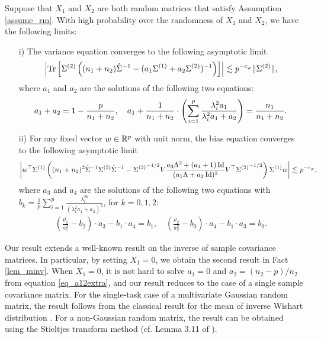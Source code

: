 \begin{theorem}\label{thm_main_RMT}
	Suppose that $X_1$ and $X_2$ are both random matrices that satisfy Assumption \ref{assume_rm}.
	With high probability over the randomness of $X_1$ and $X_2$, we have the following limits:
	\begin{enumerate}
		\item[i)]  The variance equation converges to the following asymptotic limit
			\begin{align}\label{lem_cov_shift_eq}
				{\left| {\operatorname{Tr}\left[\Sigma^{(2)} \left({(n_1 + n_2){\hat{\Sigma}^{-1}} - (a_1 \Sigma^{(1)} + a_2 \Sigma^{(2)})^{-1}}\right)\right]} \right|} \lesssim p^{-c_{\varphi}}\|\Sigma^{(2)}\|,
			\end{align}
			where $a_1$ and $a_2$ are the solutions of the following two equations:
			\begin{align}
				a_1 + a_2 = 1- \frac{p}{n_1 + n_2},\quad a_1 + \frac1{n_1 + n_2}\cdot \left({\sum_{i=1}^p \frac{\lambda_i^2 a_1}{\lambda_i^2 a_1 + a_2}}\right) = \frac{n_1}{n_1 + n_2}. \label{eq_a12extra}
			\end{align}
		\item[ii)] For any fixed vector $w\in\mathbb{R}^p$ with unit norm, the bias equation converges to the following asymptotic limit
			\begin{align}\label{lem_cov_derv_eq}
				{\left| {w^{\top} \Sigma^{(1)} \left({(n_1+n_2)^2\hat{\Sigma}^{-1} \Sigma^{(2)} \hat{\Sigma}^{-1} - {\Sigma^{(2)}}^{-1/2} V {\frac{a_3 \Lambda^2 + (a_4 + 1)\operatorname{Id}}{(a_1 \Lambda + a_2\operatorname{Id})^2}} V^{\top} {\Sigma^{(2)}}^{-1/2}}\right) \Sigma^{(1)} w} \right|} \lesssim p^{-c_{\varphi}},
			\end{align}
				where $a_{3}$ and $a_4$ are the solutions of the following two equations with $b_k = \frac1{p}\sum_{i=1}^p \frac{\lambda_i^{2k}} {(\lambda_i^2 a_1 + a_2)^2}$, for $k = 0, 1, 2$:
			\begin{align}\label{eq_a34extra}
				\left(\frac{\rho_1}{a_1^{2}} -  b_2  \right)\cdot  a_3 -  b_1 \cdot  a_4 = b_1,\quad \left(\frac{\rho_2}{a_2^{2}}-  b_0\right)\cdot  a_4 - b_1 \cdot  a_3
				= b_0.
			\end{align}
	\end{enumerate}
\end{theorem}
 Our result extends a well-known result on the inverse of sample covariance matrices.
In particular, by setting $X_1 = 0$, we obtain the second result in Fact \ref{lem_minv}.
When $X_1=0$, it is not hard to solve $a_1 = 0$ and $a_2 = (n_2-p) / n_2$ from equation \eqref{eq_a12extra}, and our result reduces to the case of a single sample covariance matrix.
For the single-task case of a multivariate Gaussian random matrix, the result follows from the classical result for the mean of inverse Wishart distribution \cite{anderson1958introduction}.
For a non-Gaussian random matrix, the result can be obtained using the Stieltjes transform method (cf. Lemma 3.11 of \citet{bai2009spectral}).

